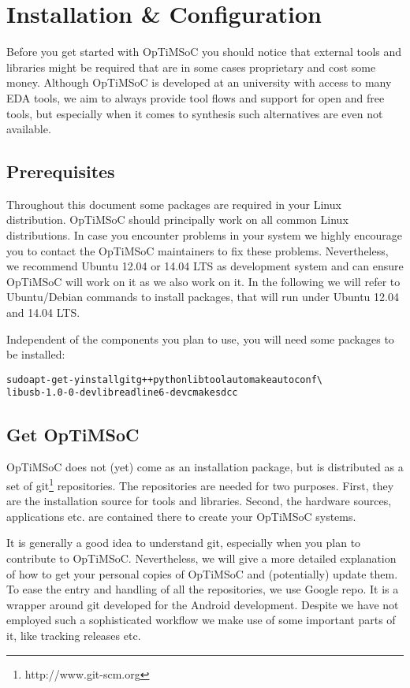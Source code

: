 \chapter{Installation \& Configuration}
\label{chap:installation}

Before you get started with OpTiMSoC you should notice that external
tools and libraries might be required that are in some cases
proprietary and cost some money. Although OpTiMSoC is developed at an
university with access to many EDA tools, we aim to always provide
tool flows and support for open and free tools, but especially when it
comes to synthesis such alternatives are even not available.

\section{Prerequisites}

Throughout this document some packages are required in your Linux
distribution. OpTiMSoC should principally work on all common Linux
distributions. In case you encounter problems in your system we highly
encourage you to contact the OpTiMSoC maintainers to fix these
problems. Nevertheless, we recommend Ubuntu 12.04 or 14.04 LTS as
development system and can ensure OpTiMSoC will work on it as we also
work on it. In the following we will refer to Ubuntu/Debian commands
to install packages, that will run under Ubuntu 12.04 and 14.04 LTS.

Independent of the components you plan to use, you will need some
packages to be installed:

\begin{alltt}
sudo apt-get -y install git g++ python libtool automake autoconf \textbackslash
    libusb-1.0-0-dev libreadline6-dev cmake sdcc
\end{alltt}

\section{Get OpTiMSoC}

OpTiMSoC does not (yet) come as an installation package, but is
distributed as a set of git\footnote{http://www.git-scm.org}
repositories. The repositories are needed for two purposes. First,
they are the installation source for tools and libraries. Second, the
hardware sources, applications etc. are contained there to create your
OpTiMSoC systems.

It is generally a good idea to understand git, especially when you
plan to contribute to OpTiMSoC. Nevertheless, we will give a more
detailed explanation of how to get your personal copies of OpTiMSoC
and (potentially) update them. To ease the entry and handling of all
the repositories, we use Google repo. It is a wrapper around git
developed for the Android development. Despite we have not employed
such a sophisticated workflow we make use of some important parts of
it, like tracking releases etc.

